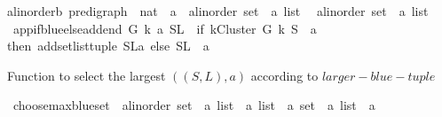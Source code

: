 \begin{isabellebody}
{\isachardoublequoteopen}{\isacharparenleft}{\kern0pt}{\isacharprime}{\kern0pt}a{\isacharcolon}{\kern0pt}{\isacharcolon}{\kern0pt}linorder{\isacharcomma}{\kern0pt}{\isacharprime}{\kern0pt}b{\isacharparenright}{\kern0pt}\ pre{\isacharunderscore}{\kern0pt}digraph\ {\isasymRightarrow}\ nat\ {\isasymRightarrow}\ {\isacharprime}{\kern0pt}a\ {\isasymRightarrow}\ {\isacharparenleft}{\kern0pt}{\isacharprime}{\kern0pt}a{\isacharcolon}{\kern0pt}{\isacharcolon}{\kern0pt}linorder\ set\ {\isasymtimes}\ {\isacharprime}{\kern0pt}a\ list{\isacharparenright}{\kern0pt}\isanewline
\ {\isasymRightarrow}\ {\isacharparenleft}{\kern0pt}{\isacharprime}{\kern0pt}a{\isacharcolon}{\kern0pt}{\isacharcolon}{\kern0pt}linorder\ set\ {\isasymtimes}\ {\isacharprime}{\kern0pt}a\ list{\isacharparenright}{\kern0pt}{\isachardoublequoteclose}\ \ \isanewline
{}\ {\isachardoublequoteopen}app{\isacharunderscore}{\kern0pt}if{\isacharunderscore}{\kern0pt}blue{\isacharunderscore}{\kern0pt}else{\isacharunderscore}{\kern0pt}add{\isacharunderscore}{\kern0pt}end\ G\ k\ a\ {\isacharparenleft}{\kern0pt}S{\isacharcomma}{\kern0pt}L{\isacharparenright}{\kern0pt}\ {\isacharequal}{\kern0pt}\ {\isacharparenleft}{\kern0pt}if\ {\isacharparenleft}{\kern0pt}kCluster\ G\ k\ {\isacharparenleft}{\kern0pt}S\ {\isasymunion}\ {\isacharbraceleft}{\kern0pt}a{\isacharbraceright}{\kern0pt}{\isacharparenright}{\kern0pt}{\isacharparenright}{\kern0pt}\ \isanewline
then\ add{\isacharunderscore}{\kern0pt}set{\isacharunderscore}{\kern0pt}list{\isacharunderscore}{\kern0pt}tuple\ {\isacharparenleft}{\kern0pt}{\isacharparenleft}{\kern0pt}S{\isacharcomma}{\kern0pt}L{\isacharparenright}{\kern0pt}{\isacharcomma}{\kern0pt}a{\isacharparenright}{\kern0pt}\ else\ {\isacharparenleft}{\kern0pt}S{\isacharcomma}{\kern0pt}L\ {\isacharat}{\kern0pt}\ {\isacharbrackleft}{\kern0pt}a{\isacharbrackright}{\kern0pt}{\isacharparenright}{\kern0pt}{\isacharparenright}{\kern0pt}{\isachardoublequoteclose}%
\begin{isamarkuptext}%
Function to select the largest $((S,L),a)$ according to $larger-blue-tuple$%
\end{isamarkuptext}\isamarkuptrue%
\isamarkupfalse%
\ choose{\isacharunderscore}{\kern0pt}max{\isacharunderscore}{\kern0pt}blue{\isacharunderscore}{\kern0pt}set\ {\isacharcolon}{\kern0pt}{\isacharcolon}{\kern0pt}\ {\isachardoublequoteopen}{\isacharparenleft}{\kern0pt}{\isacharparenleft}{\kern0pt}{\isacharprime}{\kern0pt}a{\isacharcolon}{\kern0pt}{\isacharcolon}{\kern0pt}linorder\ set\ {\isasymtimes}\ {\isacharprime}{\kern0pt}a\ list{\isacharparenright}{\kern0pt}\ {\isasymtimes}\ {\isacharprime}{\kern0pt}a{\isacharparenright}{\kern0pt}\ list\ {\isasymRightarrow}\ {\isacharparenleft}{\kern0pt}{\isacharparenleft}{\kern0pt}{\isacharprime}{\kern0pt}a\ set\ {\isasymtimes}\ {\isacharprime}{\kern0pt}a\ list{\isacharparenright}{\kern0pt}\ {\isasymtimes}\ {\isacharprime}{\kern0pt}a{\isacharparenright}{\kern0pt}{\isachardoublequoteclose}\isanewline

\end{isabellebody}
